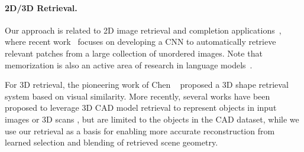 \paragraph{2D/3D Retrieval.} Our approach is related to 2D image retrieval and completion applications~\cite{datta2008image}, where recent work~\cite{radenovic2018fine, xu2020texture} focuses on developing a CNN to automatically retrieve relevant patches from a large collection of unordered images. 
Note that memorization is also an active area of research in language models~\cite{khandelwal2019generalization}.

For 3D retrieval, the pioneering work of Chen \etal~\cite{chen2003visual} proposed a 3D shape retrieval system based on visual similarity.
More recently, several works have been proposed to leverage 3D CAD model retrieval to represent objects in input images or 3D scans \cite{li2015database,izadinia2017im2cad,avetisyan2019scan2cad,kuo2020mask2cad,izadinia2020licp}, but are limited to the objects in the CAD dataset, while we use our retrieval as a basis for enabling more accurate reconstruction from learned selection and blending of retrieved scene geometry. 
